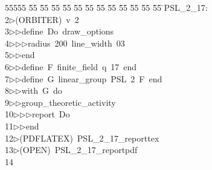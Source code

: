 %
%
\begin{tabbing}
55555 \= 55 \= 55 \= 55 \= 55 \= 55 \= 55 \= 55 \= 55 \= 55 \= 55 \= 55 \= 55 \= \>PSL\_2\_17:\\[0pt]
2\>$\triangleright$\>(ORBITER)\ v\ 2\ \\[0pt]
3\>$\triangleright$\>$\triangleright$\>define\ Do\ draw\_options\ \\[0pt]
4\>$\triangleright$\>$\triangleright$\>$\triangleright$\>radius\ 200\ line\_width\ 03\ \\[0pt]
5\>$\triangleright$\>$\triangleright$\>end\ \\[0pt]
6\>$\triangleright$\>$\triangleright$\>define\ F\ finite\_field\ q\ 17\ end\ \\[0pt]
7\>$\triangleright$\>$\triangleright$\>define\ G\ linear\_group\ PSL\ 2\ F\ end\ \\[0pt]
8\>$\triangleright$\>$\triangleright$\>with\ G\ do\ \\[0pt]
9\>$\triangleright$\>$\triangleright$\>group\_theoretic\_activity\ \\[0pt]
10\>$\triangleright$\>$\triangleright$\>$\triangleright$\>report\ Do\ \\[0pt]
11\>$\triangleright$\>$\triangleright$\>end\\[0pt]
12\>$\triangleright$\>(PDFLATEX)\ PSL\_2\_17\_reporttex\\[0pt]
13\>$\triangleright$\>(OPEN)\ PSL\_2\_17\_reportpdf\\[0pt]
14\>\end{tabbing}
